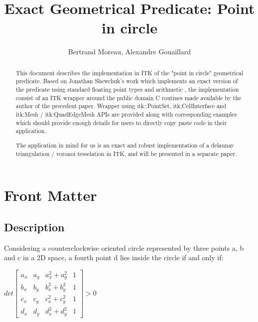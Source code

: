 \documentclass{InsightArticle}
\title{Exact Geometrical Predicate: Point in circle}
\author{Bertrand Moreau, Alexandre Gouaillard}
\newcommand{\IJhandlerIDnumber}{1338}
\begin{document}
\ifpdf
\else
\fi
\maketitle
\ifhtml
\chapter*{Front Matter\label{front}}
\fi

\begin{abstract}
\noindent
This document describes the implementation in ITK of the "point in circle" geometrical predicate.
Based on Jonathan Shewchuk's work which implements an exact version of the predicate using standard
floating point types and arithmetic \cite{shewchuk97a}, the implementation consist of an ITK wrapper around the 
public domain C routines made available by the author of the precedent paper. 
\cite{shewchuk97aurl}
Wrapper using itk::PointSet, itk:CellInterface and itk:Mesh / itk:QuadEdgeMesh APIs are provided
along with corresponding examples which should provide enough details for users to directly
copy paste code in their application.

The application in mind for us is an exact and robust implementation of a delaunay triangulation /
voronoi tesselation in ITK, and will be presented in a separate paper.

\end{abstract}

\IJhandlenote{\IJhandlerIDnumber}
\tableofcontents
\pagebreak

\section{Description}
Considering a counterclockwise oriented circle represented by three points a,
b and c in a 2D space, a fourth point d lies inside the circle if and only if:

\begin{math}
det
\begin{bmatrix}
a_x & a_y & a_x^2+a_y^2 & 1 \\
b_x & b_y & b_x^2+b_y^2 & 1 \\
c_x & c_y & c_x^2+c_y^2 & 1 \\
d_x & d_y & d_x^2+d_y^2 & 1
\end{bmatrix}
>0
\end{math}
\end{document}
